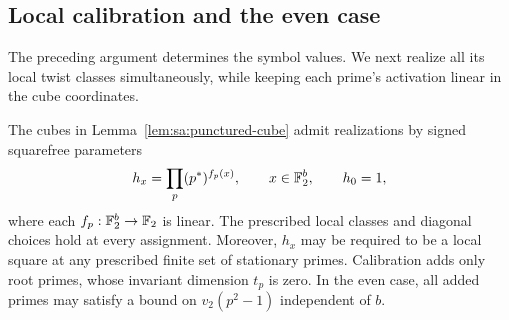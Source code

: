 \subsection{Local calibration and the even case}

The preceding argument determines the symbol values.  We next realize
all its local twist classes simultaneously, while keeping each prime's
activation linear in the cube coordinates.

\begin{lemma}
\label{lem:sa:root-calibration}
The cubes in Lemma~\ref{lem:sa:punctured-cube} admit realizations by
signed squarefree parameters
\[
 h_x=\prod_p(p^*)^{f_p(x)},\qquad x\in\mathbb F_2^b,
 \qquad h_0=1,
\]
where each $f_p:\mathbb F_2^b\to\mathbb F_2$ is linear.  The prescribed local
classes and diagonal choices hold at every assignment.  Moreover,
$h_x$ may be required to be a local square at any prescribed finite
set of stationary primes.  Calibration adds only root primes, whose
invariant dimension $t_p$ is zero.  In the even case, all added primes
may satisfy a bound on $v_2(p^2-1)$ independent of $b$.
\end{lemma}

